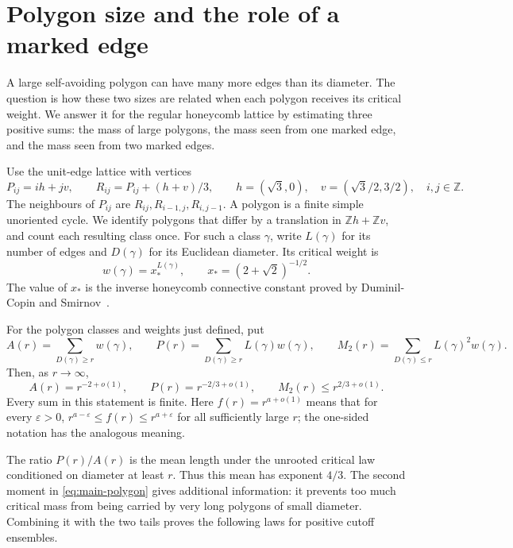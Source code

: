 \section{Polygon size and the role of a marked edge}\label{sec:introduction}

A large self-avoiding polygon can have many more edges than its diameter.
The question is how these two sizes are related when each polygon receives
its critical weight.  We answer it for the regular honeycomb lattice by
estimating three positive sums: the mass of large polygons, the mass seen
from one marked edge, and the mass seen from two marked edges.

Use the unit-edge lattice with vertices
\[
 P_{ij}=ih+jv,\qquad R_{ij}=P_{ij}+(h+v)/3,\qquad
 h=(\sqrt3,0),\quad v=(\sqrt3/2,3/2),\quad i,j\in\mathbb Z.
\]
The neighbours of $P_{ij}$ are $R_{ij},R_{i-1,j},R_{i,j-1}$.
A polygon is a finite simple unoriented cycle.  We identify polygons that
differ by a translation in $\mathbb Zh+\mathbb Zv$, and count each resulting
class once.  For such a class $\gamma$, write $L(\gamma)$ for its number of
edges and $D(\gamma)$ for its Euclidean diameter.  Its critical weight is
\[
 w(\gamma)=x_*^{L(\gamma)},\qquad x_*=(2+\sqrt2)^{-1/2}.
\]
The value of $x_*$ is the inverse honeycomb connective constant proved by
Duminil-Copin and Smirnov~\cite{DuminilCopinSmirnov2012}.

\begin{theorem}\label{thm:polygon-tails}
\label{thm:polygon-second-moment}
For the polygon classes and weights just defined, put
\[
 A(r)=\sum_{D(\gamma)\ge r}w(\gamma),\qquad
 P(r)=\sum_{D(\gamma)\ge r}L(\gamma)w(\gamma),\qquad
 M_2(r)=\sum_{D(\gamma)\le r}L(\gamma)^2w(\gamma).
\]
Then, as $r\to\infty$,
\begin{equation}\label{eq:main-polygon}
 A(r)=r^{-2+o(1)},\qquad P(r)=r^{-2/3+o(1)},\qquad
 M_2(r)\le r^{2/3+o(1)}.
\end{equation}
Every sum in this statement is finite.  Here $f(r)=r^{a+o(1)}$ means
that for every $\varepsilon>0$, $r^{a-\varepsilon}\le f(r)\le
r^{a+\varepsilon}$ for all sufficiently large $r$; the one-sided notation
has the analogous meaning.
\end{theorem}

The ratio $P(r)/A(r)$ is the mean length under the unrooted critical law
conditioned on diameter at least $r$.  Thus this mean has exponent $4/3$.
The second moment in \eqref{eq:main-polygon} gives additional information:
it prevents too much critical mass from being carried by very long
polygons of small diameter.  Combining it with the two tails proves the
following laws for positive cutoff ensembles.

